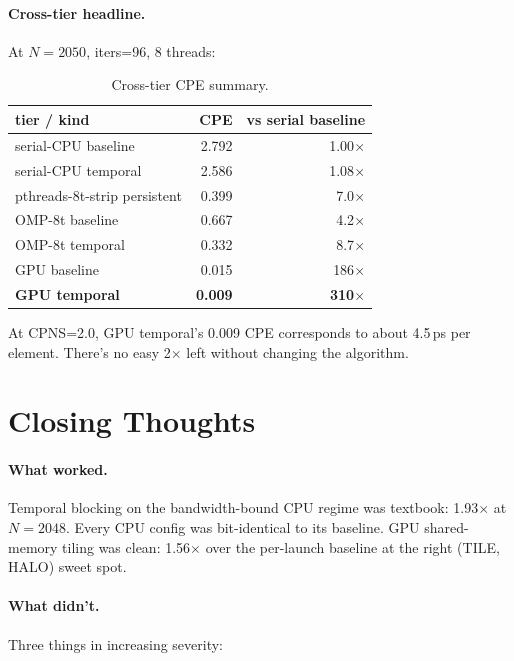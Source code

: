 \documentclass[11pt]{article}
\begin{document}
\paragraph{Cross-tier headline.} At $N{=}2050$, iters=96, 8
threads:

\begin{table}[h!]
\centering
\renewcommand{\arraystretch}{1.1}
\begin{tabular}{lrr}
\toprule
\textbf{tier / kind} & \textbf{CPE} & \textbf{vs serial baseline} \\
\midrule
serial-CPU baseline           & 2.792    & 1.00$\times$ \\
serial-CPU temporal           & 2.586    & 1.08$\times$ \\
pthreads-8t-strip persistent  & 0.399    & 7.0$\times$ \\
OMP-8t baseline               & 0.667    & 4.2$\times$ \\
OMP-8t temporal               & 0.332    & 8.7$\times$ \\
GPU baseline                  & 0.015    & 186$\times$ \\
\textbf{GPU temporal}         & \textbf{0.009} & \textbf{310$\times$} \\
\bottomrule
\end{tabular}
\caption{Cross-tier CPE summary.}
\label{tab:headline}
\end{table}

\noindent At CPNS=2.0, GPU temporal's 0.009 CPE corresponds to about
4.5\,ps per element. There's no easy 2$\times$ left without changing
the algorithm.

\section{Closing Thoughts}
\label{sec:closing}

\paragraph{What worked.} Temporal blocking on the bandwidth-bound CPU
regime was textbook: 1.93$\times$ at $N{=}2048$. Every CPU config was
bit-identical to its baseline. GPU shared-memory tiling was clean:
1.56$\times$ over the per-launch baseline at the right (TILE, HALO)
sweet spot.

\paragraph{What didn't.} Three things in increasing severity:
\end{document}
